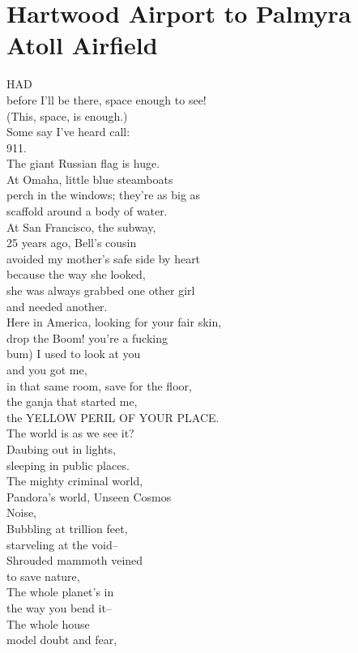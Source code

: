 \documentclass[smalldemyvopaper,11pt,twoside,onecolumn,openright,extrafontsizes]{memoir}
\newlength\drop
\begin{document}
\chapter{Hartwood Airport to Palmyra Atoll Airfield}
HAD
\\before I'll be there, space enough to see!
\\(This, space, is enough.)
\\Some say I've heard call:
\\911.
\\The giant Russian flag is huge.
\\At Omaha, little blue steamboats
\\perch in the windows; they're as big as
\\scaffold around a body of water.
\\At San Francisco, the subway,
\\25 years ago, Bell's cousin
\\avoided my mother's safe side by heart
\\because the way she looked,
\\she was always grabbed one other girl
\\and needed another.
\\Here in America, looking for your fair skin,
\\drop the Boom! you're a fucking
\\bum) I used to look at you
\\and you got me,
\\in that same room, save for the floor,
\\the ganja that started me,
\\the YELLOW PERIL OF YOUR PLACE.
\\The world is as we see it?
\\Daubing out in lights,
\\sleeping in public places.
\\The mighty criminal world,
\\Pandora's world, Unseen Cosmos
\\Noise,
\\Bubbling at trillion feet,
\\starveling at the void--
\\Shrouded mammoth veined
\\to save nature,
\\The whole planet's in
\\the way you bend it--
\\The whole house
\\model doubt and fear,
\end{document}
